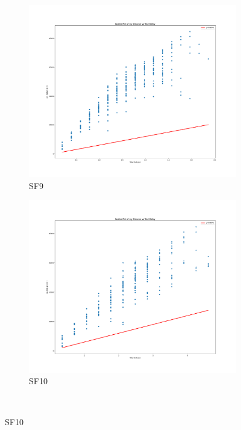 \begin{figure}[htp!]
    \\
    \begin{subfigure}{0.45\linewidth}
        \includegraphics[width=\linewidth]{images/BlindZone3.png}
        \caption{SF9}
    \end{subfigure}
   \hfill
    \begin{subfigure}{0.45\linewidth}
        \includegraphics[width=\linewidth]{images/BlindZone4.png}
        \caption{SF10}
    \end{subfigure}
    \\

\end{figure}
